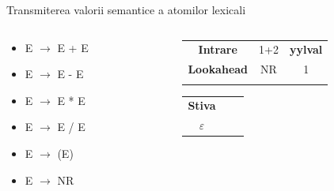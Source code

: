 \documentclass[pdf]{beamer}
\begin{document}
\begin{frame}{Transmiterea valorii semantice a atomilor lexicali}
\begin{columns}
\begin{column}{0.5\textwidth}
\begin{itemize}
	\item
	E $\rightarrow$ E + E

	\item
	E $\rightarrow$ E - E

	\item
	E $\rightarrow$ E * E

	\item
	E $\rightarrow$ E / E

	\item
	E $\rightarrow$ (E)

	\item
	E $\rightarrow$ NR

\end{itemize}
\end{column}

\begin{column}{0.4\textwidth}

\begin{tabular}{ccc|} \cline{1-3}
\multicolumn{1}{|c}{\textbf{Intrare}} & {1+2} & {\textbf{yylval}} \\ \cline{1-3}
\multicolumn{1}{|c}{\textbf{Lookahead}} & NR & 1 \\ \cline{1-3} \\
\end{tabular}
\begin{tabular}{cc|c|}
\cline{1-1}
\multicolumn{1}{|c|}{\textbf{Stiva}} & \hspace{0.75cm}\\
\multicolumn{1}{|c|}{$\varepsilon$} & \hspace{0.75cm}\\
\cline{1-1}
\end{tabular}

\end{column}
\end{columns}
\end{frame}
\end{document}
